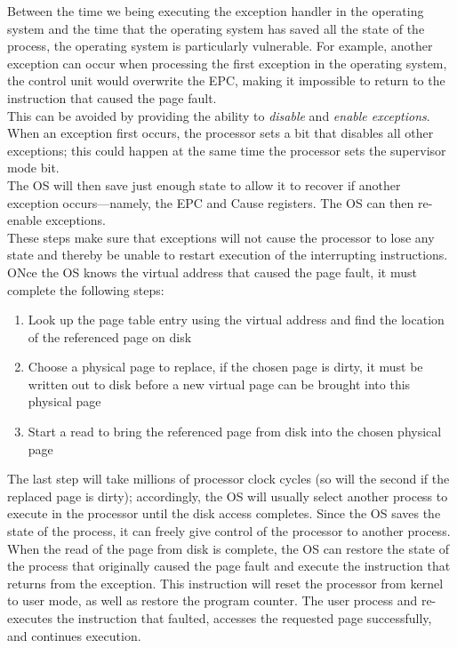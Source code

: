 \documentclass[12pt]{article}
\theoremstyle{definition}
\begin{document}
  Between the time we being executing the exception handler in the operating system and the time that the operating system has saved all the state of the process, the operating system is particularly vulnerable.
  For example, another exception can occur when processing the first exception in the operating system, the control unit would overwrite the EPC, making it impossible to return to the instruction that caused the page fault. \\
  This can be avoided by providing the ability to \emph{disable} and \emph{enable exceptions}.
  When an exception first occurs, the processor sets a bit that disables all other exceptions;
  this could happen at the same time the processor sets the supervisor mode bit. \\
  The OS will then save just enough state to allow it to recover if another exception occurs---namely, the EPC and Cause registers.
  The OS can then re-enable exceptions. \\
  These steps make sure that exceptions will not cause the processor to lose any state and thereby be unable to restart execution of the interrupting instructions. \\

  ONce the OS knows the virtual address that caused the page fault, it must complete the following steps:
  \begin{enumerate}
    \item Look up the page table entry using the virtual address and find the location of the referenced page on disk
    \item Choose a physical page to replace, if the chosen page is dirty, it must be written out to disk before a new virtual page can be brought into this physical page
    \item Start a read to bring the referenced page from disk into the chosen physical page
  \end{enumerate}

  The last step will take millions of processor clock cycles (so will the second if the replaced page is dirty);
  accordingly, the OS will usually select another process to execute in the processor until the disk access completes.
  Since the OS saves the state of the process, it can freely give control of the processor to another process. \\

  When the read of the page from disk is complete, the OS can restore the state of the process that originally caused the page fault and execute the instruction that returns from the exception.
  This instruction will reset the processor from kernel to user mode, as well as restore the program counter.
  The user process and re-executes the instruction that faulted, accesses the requested page successfully, and continues execution. \\
\end{document}
